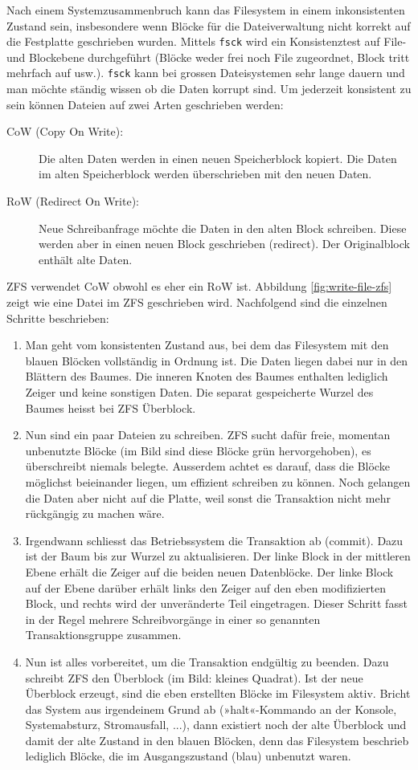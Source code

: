 Nach einem Systemzusammenbruch kann das Filesystem in einem inkonsistenten Zustand sein, insbesondere wenn Blöcke für die Dateiverwaltung nicht korrekt auf die Festplatte geschrieben wurden. Mittels \texttt{fsck} wird ein Konsistenztest auf File- und Blockebene durchgeführt (Blöcke weder frei noch File zugeordnet, Block tritt mehrfach auf usw.). \texttt{fsck} kann bei grossen Dateisystemen sehr lange dauern und man möchte ständig wissen ob die Daten korrupt sind. Um jederzeit konsistent zu sein können Dateien auf zwei Arten geschrieben werden:
\begin{description}
	\item[CoW (Copy On Write):] Die alten Daten werden in einen neuen Speicherblock kopiert. Die Daten im alten Speicherblock werden überschrieben mit den neuen Daten.
	\item[RoW (Redirect On Write):] Neue Schreibanfrage möchte die Daten in den alten Block schreiben. Diese werden aber in einen neuen Block geschrieben (redirect). Der Originalblock enthält alte Daten.
\end{description}
ZFS verwendet CoW obwohl es eher ein RoW ist. Abbildung \ref{fig:write-file-zfs} zeigt wie eine Datei im ZFS geschrieben wird. Nachfolgend sind die einzelnen Schritte beschrieben:
\begin{enumerate}
	\item Man geht vom konsistenten Zustand aus, bei dem das Filesystem mit den blauen Blöcken vollständig in Ordnung ist. Die Daten liegen dabei nur in den Blättern des Baumes. Die inneren Knoten des Baumes enthalten lediglich Zeiger und keine sonstigen Daten. Die separat gespeicherte Wurzel des Baumes heisst bei ZFS Überblock.
	\item Nun sind ein paar Dateien zu schreiben. ZFS sucht dafür freie, momentan unbenutzte Blöcke (im Bild sind diese Blöcke grün hervorgehoben), es überschreibt niemals belegte. Ausserdem achtet es darauf, dass die Blöcke möglichst beieinander liegen, um effizient schreiben zu können. Noch gelangen die Daten aber nicht auf die Platte, weil sonst die Transaktion nicht mehr rückgängig zu machen wäre.
	\item Irgendwann schliesst das Betriebssystem die Transaktion ab (commit). Dazu ist der Baum bis zur Wurzel zu aktualisieren. Der linke Block in der mittleren Ebene erhält die Zeiger auf die beiden neuen Datenblöcke. Der linke Block auf der Ebene darüber erhält links den Zeiger auf den eben modifizierten Block, und rechts wird der unveränderte Teil eingetragen. Dieser Schritt fasst in der Regel mehrere Schreibvorgänge in einer so genannten Transaktionsgruppe zusammen.
	\item Nun ist alles vorbereitet, um die Transaktion endgültig zu beenden. Dazu schreibt ZFS den Überblock (im Bild: kleines Quadrat). Ist der neue Überblock erzeugt, sind die eben erstellten Blöcke im Filesystem aktiv. Bricht das System aus irgendeinem Grund ab (»halt«-Kommando an der Konsole, Systemabsturz, Stromausfall, ...), dann existiert noch der alte Überblock und damit der alte Zustand in den blauen Blöcken, denn das Filesystem beschrieb lediglich Blöcke, die im Ausgangszustand (blau) unbenutzt waren.
\end{enumerate}
